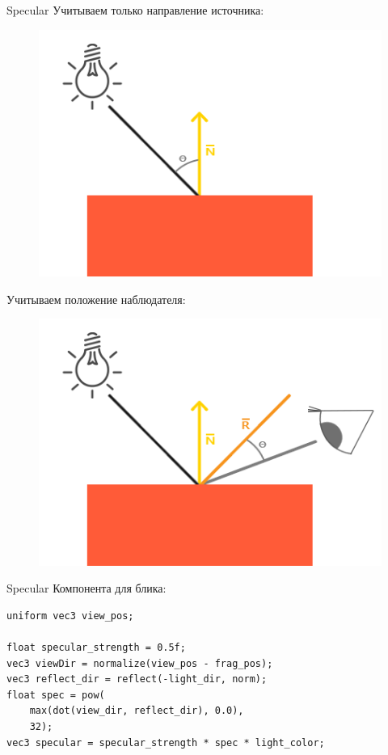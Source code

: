 \documentclass[aspectration=1610,t]{beamer}
\begin{document}
\begin{frame}[fragile]{Specular}
    Учитываем только направление источника:
    \begin{figure}[htp]
        \centering
        \includegraphics[scale=0.2]{res/diff}
    \end{figure}
    Учитываем положение наблюдателя:
    \begin{figure}[htp]
        \centering
        \includegraphics[scale=0.2]{res/spec}
    \end{figure}
\end{frame}

\begin{frame}[fragile]{Specular}
    Компонента для блика:
            {\small \begin{lstlisting}
uniform vec3 view_pos;

float specular_strength = 0.5f;
vec3 viewDir = normalize(view_pos - frag_pos);
vec3 reflect_dir = reflect(-light_dir, norm);  
float spec = pow(
    max(dot(view_dir, reflect_dir), 0.0),
    32);
vec3 specular = specular_strength * spec * light_color; 
            \end{lstlisting}}
\end{frame}
\end{document}
